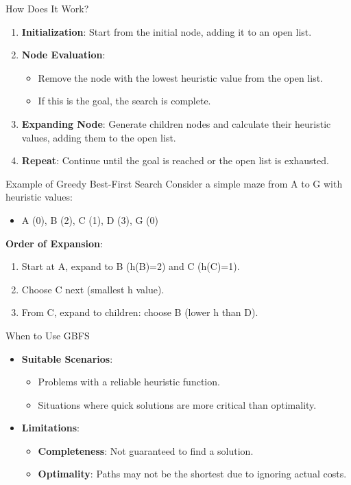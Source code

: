 \documentclass[aspectratio=169]{beamer}
\begin{document}
\begin{frame}[fragile]{How Does It Work?}
    \begin{enumerate}
        \item \textbf{Initialization}: Start from the initial node, adding it to an open list.
        \item \textbf{Node Evaluation}:
            \begin{itemize}
                \item Remove the node with the lowest heuristic value from the open list.
                \item If this is the goal, the search is complete.
            \end{itemize}
        \item \textbf{Expanding Node}: Generate children nodes and calculate their heuristic values, adding them to the open list.
        \item \textbf{Repeat}: Continue until the goal is reached or the open list is exhausted.
    \end{enumerate}
\end{frame}

\begin{frame}[fragile]{Example of Greedy Best-First Search}
    Consider a simple maze from A to G with heuristic values:
    \begin{itemize}
        \item A (0), B (2), C (1), D (3), G (0)
    \end{itemize}
    \textbf{Order of Expansion}:
    \begin{enumerate}
        \item Start at A, expand to B (h(B)=2) and C (h(C)=1).
        \item Choose C next (smallest h value).
        \item From C, expand to children: choose B (lower h than D).
    \end{enumerate}
\end{frame}

\begin{frame}[fragile]{When to Use GBFS}
    \begin{itemize}
        \item \textbf{Suitable Scenarios}:
            \begin{itemize}
                \item Problems with a reliable heuristic function.
                \item Situations where quick solutions are more critical than optimality.
            \end{itemize}
        \item \textbf{Limitations}:
            \begin{itemize}
                \item \textbf{Completeness}: Not guaranteed to find a solution.
                \item \textbf{Optimality}: Paths may not be the shortest due to ignoring actual costs.
            \end{itemize}
    \end{itemize}
\end{frame}
\end{document}
